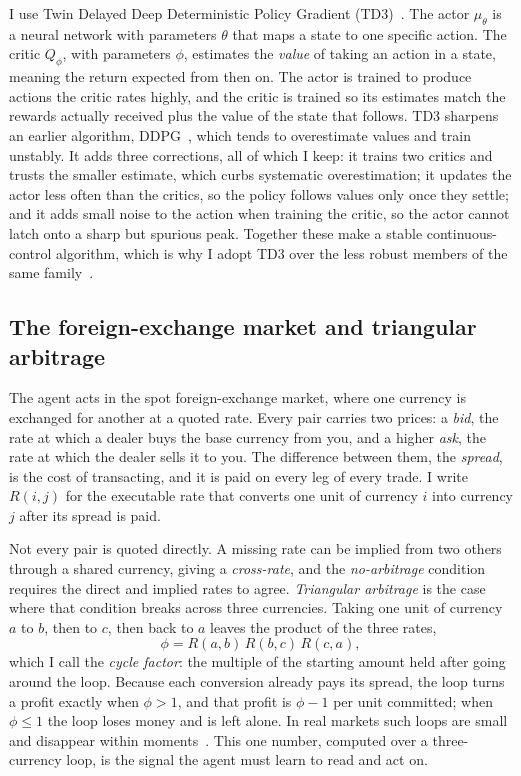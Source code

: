 \documentclass[12pt,a4paper]{article}
\begin{document}
I use Twin Delayed Deep Deterministic Policy Gradient (TD3)~\citep{fujimoto2018td3}. The actor
$\mu_\theta$ is a neural network with parameters $\theta$ that maps a state to one specific
action. The critic $Q_\phi$, with parameters $\phi$, estimates the \emph{value} of taking an
action in a state, meaning the return expected from then on. The actor is trained to produce
actions the critic rates highly, and the critic is trained so its estimates match the rewards
actually received plus the value of the state that follows. TD3 sharpens an earlier algorithm,
DDPG~\citep{lillicrap2016ddpg}, which tends to overestimate values and train unstably. It adds
three corrections, all of which I keep: it trains two critics and trusts the smaller estimate,
which curbs systematic overestimation; it updates the actor less often than the critics, so the
policy follows values only once they settle; and it adds small noise to the action when training
the critic, so the actor cannot latch onto a sharp but spurious peak. Together these make a
stable continuous-control algorithm, which is why I adopt TD3 over the less robust members of
the same family~\citep{silver2014dpg}.

\subsection{The foreign-exchange market and triangular arbitrage}

The agent acts in the spot foreign-exchange market, where one currency is exchanged for another
at a quoted rate. Every pair carries two prices: a \emph{bid}, the rate at which a dealer buys
the base currency from you, and a higher \emph{ask}, the rate at which the dealer sells it to
you. The difference between them, the \emph{spread}, is the cost of transacting, and it is paid
on every leg of every trade.
I write $R(i,j)$ for the executable rate that converts one unit of currency $i$ into currency
$j$ after its spread is paid.

Not every pair is quoted directly. A missing rate can be implied from two others through a
shared currency, giving a \emph{cross-rate}, and the \emph{no-arbitrage} condition requires the
direct and implied rates to agree. \emph{Triangular arbitrage} is the case where that condition
breaks across three currencies. Taking one unit of currency $a$ to $b$, then to $c$, then back
to $a$ leaves the product of the three rates,
\begin{equation}
\phi = R(a,b)\,R(b,c)\,R(c,a),
\label{eq:noarb}
\end{equation}
which I call the \emph{cycle factor}: the multiple of the starting amount held after going
around the loop. Because each conversion already pays its spread, the loop turns a profit
exactly when $\phi>1$, and that profit is $\phi-1$ per unit committed; when $\phi\le 1$ the loop
loses money and is left alone. In real markets such loops are small and disappear within
moments~\citep{fenn2009mirage}. This one number, computed over a three-currency loop, is the
signal the agent must learn to read and act on.
\end{document}
